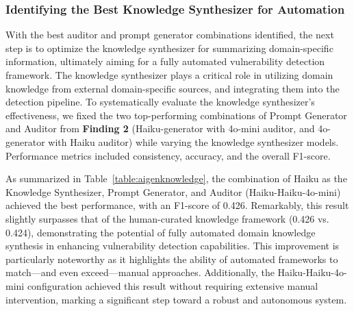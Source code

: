 \subsubsection{Identifying the Best Knowledge Synthesizer for Automation}
With the best auditor and prompt generator combinations identified, the next step is to optimize the knowledge synthesizer for summarizing domain-specific information, ultimately aiming for a fully automated vulnerability detection framework. The knowledge synthesizer plays a critical role in utilizing domain knowledge from external domain-specific sources, and integrating them into the detection pipeline.
To systematically evaluate the knowledge synthesizer's effectiveness, we fixed the two top-performing combinations of Prompt Generator and Auditor from \textbf{Finding 2} (Haiku-generator with 4o-mini auditor, and 4o-generator with Haiku auditor) while varying the knowledge synthesizer models. Performance metrics included consistency, accuracy, and the overall F1-score.

As summarized in Table~\ref{table:aigenknowledge}, the combination of Haiku as the Knowledge Synthesizer, Prompt Generator, and Auditor (Haiku-Haiku-4o-mini) achieved the best performance, with an F1-score of 0.426. Remarkably, this result slightly surpasses that of the human-curated knowledge framework (0.426 vs. 0.424), demonstrating the potential of fully automated domain knowledge synthesis in enhancing vulnerability detection capabilities.
This improvement is particularly noteworthy as it highlights the ability of automated frameworks to match—and even exceed—manual approaches. Additionally, the Haiku-Haiku-4o-mini configuration achieved this result without requiring extensive manual intervention, marking a significant step toward a robust and autonomous system.



